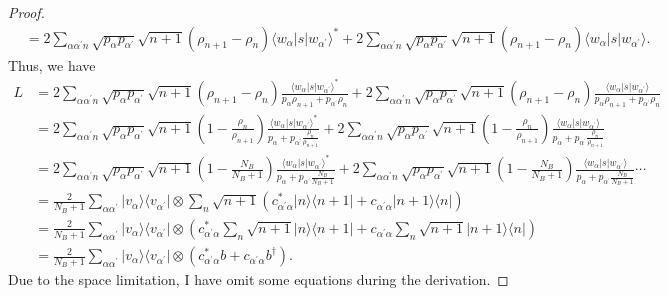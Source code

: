 \documentclass[../../note.tex]{subfiles}
\begin{document}
\begin{proof}
\begin{align}
        &= 2 \sum_{\alpha \alpha^\prime n} \sqrt{p_{\alpha} p_{\alpha^\prime}} \sqrt{n+1} (\rho_{n+1} - \rho_n) \langle w_{\alpha} \vert s \vert w_{\alpha^\prime} \rangle^\ast
        + 2 \sum_{\alpha \alpha^\prime n} \sqrt{p_{\alpha} p_{\alpha^\prime}} \sqrt{n+1} (\rho_{n+1} - \rho_n) \langle w_{\alpha} \vert s \vert w_{\alpha^\prime} \rangle.
    \end{align}
    Thus, we have
    \begin{align}
        L
        &= 2 \sum_{\alpha \alpha^\prime n} \sqrt{p_{\alpha} p_{\alpha^\prime}} \sqrt{n+1} (\rho_{n+1} - \rho_n) \frac{\langle w_{\alpha} \vert s \vert w_{\alpha^\prime} \rangle^\ast}{p_{\alpha} \rho_{n+1} + p_{\alpha^\prime} \rho_n}
        + 2 \sum_{\alpha \alpha^\prime n} \sqrt{p_{\alpha} p_{\alpha^\prime}} \sqrt{n+1} (\rho_{n+1} - \rho_n) \frac{\langle w_{\alpha} \vert s \vert w_{\alpha^\prime} \rangle}{p_{\alpha} \rho_{n+1} + p_{\alpha^\prime} \rho_n} \\
        &= 2 \sum_{\alpha \alpha^\prime n} \sqrt{p_{\alpha} p_{\alpha^\prime}} \sqrt{n+1} (1 - \frac{\rho_{n}}{\rho_{n+1}}) \frac{\langle w_{\alpha} \vert s \vert w_{\alpha^\prime} \rangle^\ast}{p_{\alpha} + p_{\alpha^\prime} \frac{\rho_n}{\rho_{n+1}}}
        + 2 \sum_{\alpha \alpha^\prime n} \sqrt{p_{\alpha} p_{\alpha^\prime}} \sqrt{n+1} (1 - \frac{\rho_{n}}{\rho_{n+1}}) \frac{\langle w_{\alpha} \vert s \vert w_{\alpha^\prime} \rangle}{p_{\alpha} + p_{\alpha^\prime} \frac{\rho_n}{\rho_{n+1}}} \\
        &= 2 \sum_{\alpha \alpha^\prime n} \sqrt{p_{\alpha} p_{\alpha^\prime}} \sqrt{n+1} (1 - \frac{N_B}{N_B+1}) \frac{\langle w_{\alpha} \vert s \vert w_{\alpha^\prime} \rangle^\ast}{p_{\alpha} + p_{\alpha^\prime} \frac{N_B}{N_B+1}}
        + 2 \sum_{\alpha \alpha^\prime n} \sqrt{p_{\alpha} p_{\alpha^\prime}} \sqrt{n+1} (1 - \frac{N_B}{N_B+1}) \frac{\langle w_{\alpha} \vert s \vert w_{\alpha^\prime} \rangle}{p_{\alpha} + p_{\alpha^\prime} \frac{N_B}{N_B+1}} \cdots \\
        &= \frac{2}{N_B + 1} \sum_{\alpha \alpha^\prime} \vert v_{\alpha} \rangle \langle v_{\alpha^\prime} \vert \otimes \sum_{n} \sqrt{n+1} \left(c^\ast_{\alpha^\prime \alpha} \vert n \rangle \langle n+1 \vert + c_{\alpha^\prime \alpha} \vert n+1 \rangle \langle n \vert \right) \\
        &= \frac{2}{N_B + 1} \sum_{\alpha \alpha^\prime} \vert v_{\alpha} \rangle \langle v_{\alpha^\prime} \vert \otimes  \left(c^\ast_{\alpha^\prime \alpha}\sum_{n} \sqrt{n+1} \vert n \rangle \langle n+1 \vert + c_{\alpha^\prime \alpha} \sum_{n} \sqrt{n+1} \vert n+1 \rangle \langle n \vert \right) \\
        &= \frac{2}{N_B + 1} \sum_{\alpha \alpha^\prime} \vert v_{\alpha} \rangle \langle v_{\alpha^\prime} \vert \otimes  \left(c^\ast_{\alpha^\prime \alpha} b + c_{\alpha^\prime \alpha} b^\dagger \right).
    \end{align}
    Due to the space limitation, I have omit some equations during the derivation.
\end{proof}
\end{document}

